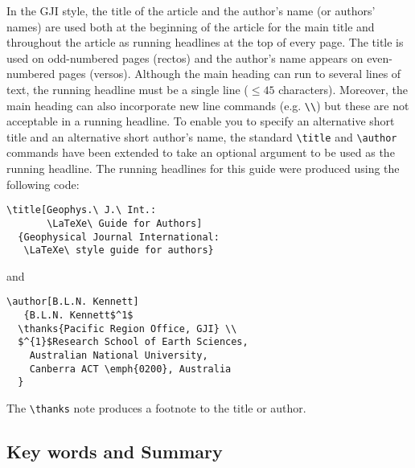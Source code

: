 \documentclass{gji}
\let\leqslant=\leq
\begin{document}
In the GJI style, the title of the article and the author's name (or
authors' names) are used both at the beginning of the article for the
main title and throughout the article as running headlines at the top
of every page. The title is used on odd-numbered pages (rectos) and the
author's name appears on even-numbered pages (versos). Although the
main heading can run to several lines of text, the running headline
must be a single line ($\leqslant 45$ characters). Moreover, the main
heading can also incorporate new line commands (e.g. \verb"\\") but
these are not acceptable in a running headline. To enable you to
specify an alternative short title and an alternative short author's
name, the standard \verb"\title" and \verb"\author" commands have been
extended to take an optional argument to be used as the running
headline. The running headlines for this guide were produced using the
following code:
\begin{verbatim}
\title[Geophys.\ J.\ Int.:
       \LaTeXe\ Guide for Authors]
  {Geophysical Journal International:
   \LaTeXe\ style guide for authors}
\end{verbatim}
and
\begin{verbatim}
\author[B.L.N. Kennett]
   {B.L.N. Kennett$^1$
  \thanks{Pacific Region Office, GJI} \\
  $^{1}$Research School of Earth Sciences,
    Australian National University,
    Canberra ACT \emph{0200}, Australia
  }
\end{verbatim}
The \verb"\thanks" note produces a footnote to the title or author.

\subsection{Key words and Summary}
\end{document}
